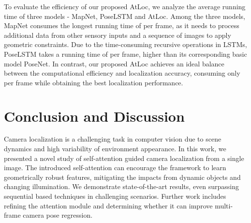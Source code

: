 \documentclass[letterpaper]{article}
\begin{document}
To evaluate the efficiency of our proposed AtLoc, we analyze the average running time of three models - MapNet, PoseLSTM and AtLoc. 
Among the three models, MapNet consumes the longest running time of  per frame, as it needs to process additional data from other sensory inputs and a sequence of images to apply geometric constraints. 
Due to the time-consuming recursive operations in LSTMs, PoseLSTM takes a running time of  per frame,  higher than its corresponding basic model PoseNet. 
In contrast, our proposed AtLoc achieves an ideal balance between the computational efficiency and localization accuracy, consuming only  per frame while obtaining the best localization performance.


\section{Conclusion and Discussion}
Camera localization is a challenging task in computer vision due to scene dynamics and high variability of environment appearance.
In this work, we presented a novel study of self-attention guided camera localization from a single image. 
The introduced self-attention can encourage the framework to learn geometrically robust features, mitigating the impacts from dynamic objects and changing illumination.
We demonstrate state-of-the-art results, even surpassing sequential based techniques in challenging scenarios. 
Further work includes refining the attention module and determining whether it can improve multi-frame camera pose regression.

\FloatBarrier



\end{document}
